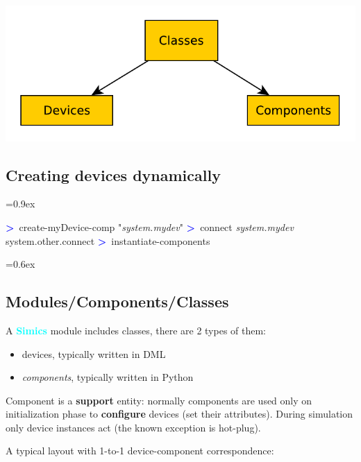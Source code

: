 \documentclass[8pt]{extarticle}
\newenvironment{code}[1][]{%
\begin{prebox}[#1]\obeylines%
\fontdimen2\font=0.9ex%
}{%
\end{prebox}%
\fontdimen2\font=0.6ex%
}
\newcommand{\sprompt}{\textcolor{blue}{\textbf{>}\ }}
\newcommand{\p}[1]{\textit{\large#1}}
\newcommand{\Simics}{\textcolor{cyan}{\textbf{Simics}}}
\newlength{\MyLen}
\begin{document}
\begin{multicols*}{3}
\begin{tabular}{p{\the\MyLen}p{\linewidth-\the\MyLen-0.8cm}}
    \end{tabular}

\includegraphics[width=\linewidth]{diagrams/classes_devices_components.pdf}
\subsection{Creating devices dynamically}
\begin{code}
\sprompt create-myDevice-comp "\p{system.mydev}"
\sprompt connect \p{system.mydev} {system.other.connect}
\sprompt instantiate-components
\end{code}

\subsection{Modules/Components/Classes}
A \Simics{} module includes classes, there are 2 types of them:
        \begin{itemize}
            \item devices, typically written in DML
            \item \textit{components}, typically written in Python
        \end{itemize}
%
%
%

Component is a \textbf{support} entity: normally components are used only
on initialization phase to \textbf{configure} devices (set their attributes).
During simulation only device instances act (the known exception is hot-plug).

        \vspace{0.3em}
A typical layout with 1-to-1 device-component correspondence:


\end{multicols*}
\end{document}
